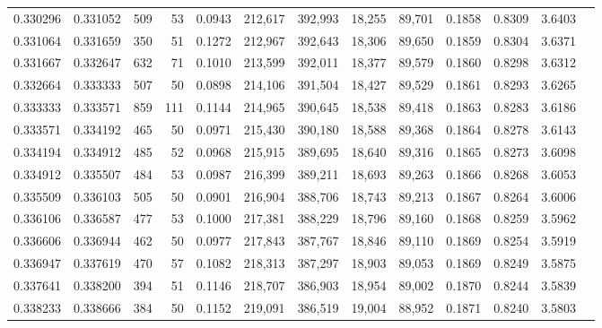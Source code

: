 \begin{tabular}{rrrrrrrrrrrrr}
0.330296 & 0.331052 &    509 &    53 &                                     0.0943 & 212,617 & 392,993 &  18,255 &  89,701 & 0.1858 & 0.8309 & 3.6403 \\
0.331064 & 0.331659 &    350 &    51 &                                     0.1272 & 212,967 & 392,643 &  18,306 &  89,650 & 0.1859 & 0.8304 & 3.6371 \\
0.331667 & 0.332647 &    632 &    71 &                                     0.1010 & 213,599 & 392,011 &  18,377 &  89,579 & 0.1860 & 0.8298 & 3.6312 \\
0.332664 & 0.333333 &    507 &    50 &                                     0.0898 & 214,106 & 391,504 &  18,427 &  89,529 & 0.1861 & 0.8293 & 3.6265 \\
0.333333 & 0.333571 &    859 &   111 &                                     0.1144 & 214,965 & 390,645 &  18,538 &  89,418 & 0.1863 & 0.8283 & 3.6186 \\
0.333571 & 0.334192 &    465 &    50 &                                     0.0971 & 215,430 & 390,180 &  18,588 &  89,368 & 0.1864 & 0.8278 & 3.6143 \\
0.334194 & 0.334912 &    485 &    52 &                                     0.0968 & 215,915 & 389,695 &  18,640 &  89,316 & 0.1865 & 0.8273 & 3.6098 \\
0.334912 & 0.335507 &    484 &    53 &                                     0.0987 & 216,399 & 389,211 &  18,693 &  89,263 & 0.1866 & 0.8268 & 3.6053 \\
0.335509 & 0.336103 &    505 &    50 &                                     0.0901 & 216,904 & 388,706 &  18,743 &  89,213 & 0.1867 & 0.8264 & 3.6006 \\
0.336106 & 0.336587 &    477 &    53 &                                     0.1000 & 217,381 & 388,229 &  18,796 &  89,160 & 0.1868 & 0.8259 & 3.5962 \\
0.336606 & 0.336944 &    462 &    50 &                                     0.0977 & 217,843 & 387,767 &  18,846 &  89,110 & 0.1869 & 0.8254 & 3.5919 \\
0.336947 & 0.337619 &    470 &    57 &                                     0.1082 & 218,313 & 387,297 &  18,903 &  89,053 & 0.1869 & 0.8249 & 3.5875 \\
0.337641 & 0.338200 &    394 &    51 &                                     0.1146 & 218,707 & 386,903 &  18,954 &  89,002 & 0.1870 & 0.8244 & 3.5839 \\
0.338233 & 0.338666 &    384 &    50 &                                     0.1152 & 219,091 & 386,519 &  19,004 &  88,952 & 0.1871 & 0.8240 & 3.5803 \\

\end{tabular}
